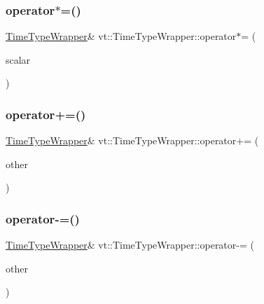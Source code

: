 \subsubsection{\texorpdfstring{operator$\ast$=()}{operator*=()}}
{\footnotesize\ttfamily \hyperlink{structvt_1_1_time_type_wrapper}{Time\+Type\+Wrapper}\& vt\+::\+Time\+Type\+Wrapper\+::operator$\ast$= (\begin{DoxyParamCaption}\item[{const double}]{scalar }\end{DoxyParamCaption})\hspace{0.3cm}{\ttfamily [inline]}}

\mbox{\label{structvt_1_1_time_type_wrapper_aa76022003bb022bb14ed92e59e12559d}} 
\subsubsection{\texorpdfstring{operator+=()}{operator+=()}}
{\footnotesize\ttfamily \hyperlink{structvt_1_1_time_type_wrapper}{Time\+Type\+Wrapper}\& vt\+::\+Time\+Type\+Wrapper\+::operator+= (\begin{DoxyParamCaption}\item[{const \hyperlink{structvt_1_1_time_type_wrapper}{Time\+Type\+Wrapper} \&}]{other }\end{DoxyParamCaption})\hspace{0.3cm}{\ttfamily [inline]}}

\mbox{\label{structvt_1_1_time_type_wrapper_a46d946edc6cf56409f20901c7cb62efc}} 
\subsubsection{\texorpdfstring{operator-\/=()}{operator-=()}}
{\footnotesize\ttfamily \hyperlink{structvt_1_1_time_type_wrapper}{Time\+Type\+Wrapper}\& vt\+::\+Time\+Type\+Wrapper\+::operator-\/= (\begin{DoxyParamCaption}\item[{const \hyperlink{structvt_1_1_time_type_wrapper}{Time\+Type\+Wrapper} \&}]{other }\end{DoxyParamCaption})\hspace{0.3cm}{\ttfamily [inline]}}


